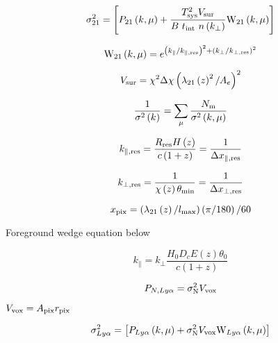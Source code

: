 \begin{equation}
\sigma_{21}^2 = \left[ P_{21}\left(k, \mu \right) + \frac{T^2_{\rm sys} V_{\rm sur}}{B \ t_{\rm int} \ n \left(k_{\perp}\right)} {\rm W}_{21}\left(k, \mu \right) \right]
\end{equation}

\begin{equation}
{\rm W}_{21}\left(k, \mu \right) = e^{\left(k_{\parallel} / k_{\parallel, \rm res} \right)^2 + \left(k_{\perp} / k_{\perp, \rm res} \right)^2}
\end{equation}

\begin{equation}
V_{\rm sur} = \chi^2 \Delta \chi \left( \lambda_{21} \left( z \right)^2 / A_e\right)^2
\end{equation}

\begin{equation}
\frac{1}{\sigma^2 \left( k \right)} = \sum_{\mu} \frac{N_{\rm m}}{\sigma^2 \left( k, \mu \right)}
\end{equation}

\begin{equation}
k_{\parallel, \rm res} = \frac{R_{\rm res} H \left( z\right)}{c \left(1 + z\right)} = \frac{1}{\Delta x_{\parallel, \rm res}}
\end{equation}

\begin{equation}
k_{\perp, \rm res} = \frac{1}{\chi \left( z \right) \theta_{\rm min}} = \frac{1}{\Delta x_{\perp, \rm res}}
\end{equation}

\begin{equation}
x_{\rm pix} = \left( \lambda_{21} \left( z \right) / l_{\rm max}\right) \left( \pi / 180 \right) / 60
\end{equation}

Foreground wedge equation below

\begin{equation}
k_{\parallel} = k_{\perp} \frac{H_0 D_c E \left( z \right) \theta_0}{c \left( 1 + z \right)}
\end{equation}

\begin{equation}
P_{N, Ly\alpha} = \sigma_{\rm N}^2 V_{\rm vox}
\end{equation}

$V_{\rm vox} = A_{\rm pix} r_{\rm pix}$

\begin{equation}
\sigma_{Ly\alpha}^2 = \left[ P_{Ly\alpha}\left(k, \mu \right) + \sigma_{\rm N}^2 V_{\rm vox} {\rm W}_{Ly\alpha}\left(k, \mu \right) \right]
\end{equation}
